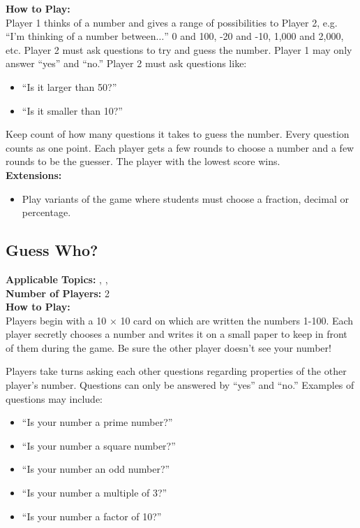 	\noindent \textbf{How to Play:}\\
	Player 1 thinks of a number and gives a range of possibilities to Player 2, e.g. ``I'm thinking of a number between$\ldots$'' 0 and 100, -20 and -10, 1,000 and 2,000, etc. Player 2 must ask questions to try and guess the number. Player 1 may only answer ``yes'' and ``no.'' Player 2 must ask questions like:
	\begin{itemize}
	\item ``Is it larger than 50?''
	\item ``Is it smaller than 10?''
	\end{itemize}
	
	Keep count of how many questions it takes to guess the number. Every question counts as one point. Each player gets a few rounds to choose a number and a few rounds to be the guesser. The player with the lowest score wins.\\
	
	\noindent \textbf{Extensions:}
	\begin{itemize}
	\item Play variants of the game where students must choose a fraction, decimal or percentage.
	\end{itemize}
	
	\subsection{Guess Who?} \label{guesswho}
	\textbf{Applicable Topics:} , , \\	
	\textbf{Number of Players:} 2\\
	
	\noindent \textbf{How to Play:}\\
	Players begin with a 10 $\times$ 10 card on which are written the numbers 1-100. Each player secretly chooses a number and writes it on a small paper to keep in front of them during the game. Be sure the other player doesn't see your number!
	
	Players take turns asking each other questions regarding properties of the other player's number. Questions can only be answered by ``yes'' and ``no.'' Examples of questions may include:
	\begin{itemize}
	\item ``Is your number a prime number?''
	\item ``Is your number a square number?''
	\item ``Is your number an odd number?''
	\item ``Is your number a multiple of 3?''
	\item ``Is your number a factor of 10?''
	\end{itemize}
	
